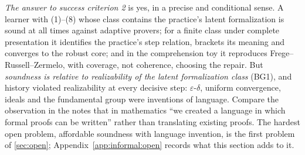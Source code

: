 \emph{The answer to success criterion 2} is yes, in a precise and conditional sense. A learner with (1)--(8) whose class contains the practice's latent formalization is sound at all times against adaptive provers; for a finite class under complete presentation it identifies the practice's step relation, brackets its meaning and converges to the robust core; and in the comprehension toy it reproduces Frege--Russell--Zermelo, with coverage, not coherence, choosing the repair. But \emph{soundness is relative to realizability of the latent formalization class} (BG1), and history violated realizability at every decisive step: $\varepsilon$-$\delta$, uniform convergence, ideals and the fundamental group were inventions of language. Compare the observation in the notes that in mathematics ``we created a language in which formal proofs can be written'' rather than translating existing proofs. The hardest open problem, affordable soundness with language invention, is the first problem of \cref{sec:open}; Appendix~\ref{app:informal:open} records what this section adds to it.

